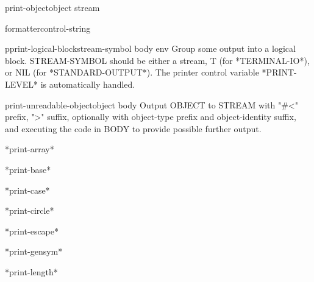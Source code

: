 \begin{generic}{print-object}{object stream}
  
\end{generic}

\begin{macro}{formatter}{control-string}
  
\end{macro}

\begin{macro}{pprint-logical-block}{stream-symbol \body body \env env}
  Group some output into a logical block. STREAM-SYMBOL should be either a
   stream, T (for *TERMINAL-IO*), or NIL (for *STANDARD-OUTPUT*). The printer
   control variable *PRINT-LEVEL* is automatically handled.
\end{macro}

\begin{macro}{print-unreadable-object}{object \body body}
  Output OBJECT to STREAM with "\#<" prefix, ">" suffix, optionally
  with object-type prefix and object-identity suffix, and executing the
  code in BODY to provide possible further output.
\end{macro}

\begin{variable}{*print-array*}{}
  
\end{variable}

\begin{variable}{*print-base*}{}
  
\end{variable}

\begin{variable}{*print-case*}{}
  
\end{variable}

\begin{variable}{*print-circle*}{}
  
\end{variable}

\begin{variable}{*print-escape*}{}
  
\end{variable}

\begin{variable}{*print-gensym*}{}
  
\end{variable}

\begin{variable}{*print-length*}{}
  
\end{variable}


